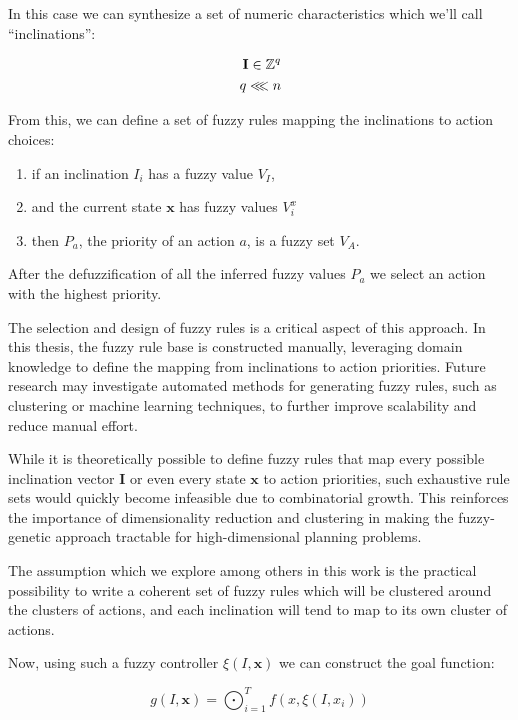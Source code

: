 \documentclass[12pt, a4paper]{report}
\begin{document}
	In this case we can synthesize a set of numeric characteristics which we'll call ``inclinations'':
	
	\begin{eqnarray}
		\mathbf{I} \in \mathbb{Z}^q\\
		q \llless n \label{q<<n}
	\end{eqnarray}

	From this, we can define a set of fuzzy rules\cite{ray2014softcomputing} mapping the inclinations to action choices:

	\begin{enumerate}
		\item if an inclination $I_i$ has a fuzzy value $V_I$,
		\item and the current state $\mathbf{x}$ has fuzzy values $V^x_i$
		\item then $P_a$, the priority of an action $a$, is a fuzzy set $V_A$.
	\end{enumerate}
	
	After the defuzzification of all the inferred fuzzy values $P_a$ we select an action with the highest priority.
	
	The selection and design of fuzzy rules is a critical aspect of this approach.
	In this thesis, the fuzzy rule base is constructed manually, leveraging domain knowledge to define the mapping from inclinations to action priorities.
	Future research may investigate automated methods for generating fuzzy rules, such as clustering or machine learning techniques, to further improve scalability and reduce manual effort.

	While it is theoretically possible to define fuzzy rules that map every possible inclination vector $\mathbf{I}$ or even every state $\mathbf{x}$ to action priorities, such exhaustive rule sets would quickly become infeasible due to combinatorial growth.
	This reinforces the importance of dimensionality reduction and clustering in making the fuzzy-genetic approach tractable for high-dimensional planning problems.

	The assumption which we explore among others in this work is the practical possibility to write a coherent set of fuzzy rules which will be clustered around the clusters of actions, and each inclination will tend to map to its own cluster of actions.
	
	Now, using such a fuzzy controller $\xi(I, \mathbf{x})$ we can construct the goal function:
	
	\begin{equation}\label{definitions:goal-function}
		g(I, \mathbf{x}) = \bigodot_{i=1}^{T} f(x, \xi(I, x_i))
	\end{equation}
	
\end{document}
